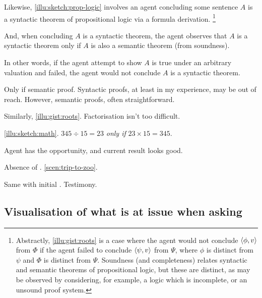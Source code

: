 \begin{note}
  Likewise, \autoref{illu:sketch:prop-logic} involves an agent concluding some sentence \(A\) is a syntactic theorem of propositional logic via a formula derivation.%
  \footnote{
    Abstractly, \autoref{illu:gist:roots} is a case where the agent would not conclude \(\langle \phi, v \rangle\) from \(\Phi\) if the agent failed to conclude \(\langle \psi, v \rangle\) from \(\Psi\), where \(\phi\) is distinct from \(\psi\) and \(\Phi\) is distinct from \(\Psi\).
    Soundness (and completeness) relates syntactic and semantic theorems of propositional logic, but these are distinct, as may be observed by considering, for example, a logic which is incomplete, or an unsound proof system.
  }

  And, when concluding \(A\) is a syntactic theorem, the agent observes that \(A\) is a syntactic theorem only if \(A\) is also a semantic theorem (from soundness).

  In other words, if the agent attempt to show \(A\) is true under an arbitrary valuation and failed, the agent would not conclude \(A\) is a syntactic theorem.

  Only if semantic proof.
  Syntactic proofs, at least in my experience, may be out of reach.
  However, semantic proofs, often straightforward.
\end{note}

\begin{note}
  Similarly, \autoref{illu:gist:roots}.
  Factorisation isn't too difficult.

  \autoref{illu:sketch:math}.
  \(345 \div 15 = 23\) \emph{only if} \(23 \times 15 = 345\).

  Agent has the opportunity, and current result looks good.
\end{note}

\begin{note}
  Absence of \requ{}.
  \autoref{scen:trip-to-zoo}.

  Same with initial .
  Testimony.
\end{note}

\subsection[Visualisation]{Visualisation of what is at issue when asking \qzS{}}

